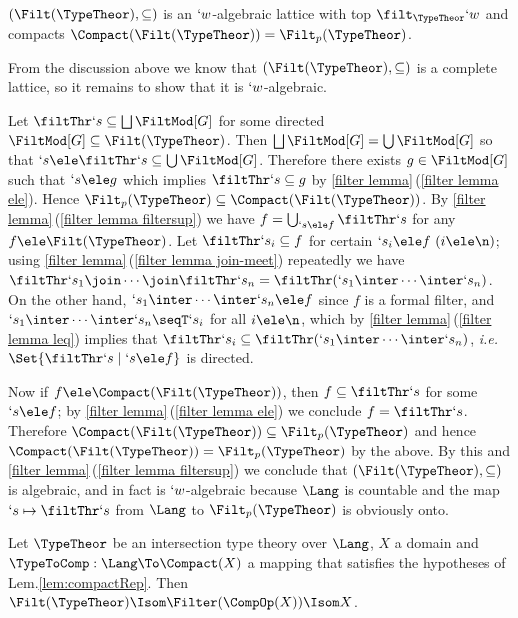 \documentclass{CSML}
\def\ie{\emph{i.e.}}
\begin{document}
 \begin{lem} \label{prop:formal-filt}
$(\Filt(\TypeTheor),\subseteq)$ is an $`w $-algebraic lattice with top $\filt_{\TypeTheor} `w$ and compacts $\Compact(\Filt(\TypeTheor)) = \Filt_p(\TypeTheor)$.
 \end{lem}

 \begin{Proof}
From the discussion above we know that $(\Filt(\TypeTheor),\subseteq)$ is a complete lattice, so it remains to show that it is $`w$-algebraic.

Let $\filtThr `s \subseteq \bigsqcup{\FiltMod[G]}$ for some directed ${\FiltMod[G]} \subseteq \Filt(\TypeTheor)$. 
Then $\bigsqcup{\FiltMod[G]} = \bigcup{\FiltMod[G]}$ so that $`s\ele \filtThr `s \subseteq \bigcup{\FiltMod[G]}$. Therefore there exists $g\in{\FiltMod[G]}$ such that $`s\ele g$ which implies $\filtThr `s \subseteq g$ by \ref{filter lemma}\,(\ref{filter lemma ele}). 
Hence $\Filt_p(\TypeTheor) \subseteq \Compact(\Filt(\TypeTheor))$.
%
By \ref{filter lemma}\,(\ref{filter lemma filtersup}) we have $f = \bigcup_{`s \ele f} \filtThr `s $ for any $f \ele \Filt(\TypeTheor)$. 
Let $\filtThr `s_i \subseteq f$ for certain $`s_i \ele f ~ (i \ele \n)$; using \ref{filter lemma}\,(\ref{filter lemma join-meet}) repeatedly we have $\filtThr `s_1 \join\cdots\join \filtThr`s_n = \filtThr(`s_1\inter\cdots\inter `s_n)$. 
On the other hand, $`s_1\inter\cdots\inter `s_n \ele f$ since $f$ is a formal filter, and $`s_1\inter\cdots\inter `s_n \seqT `s_i$ for all $i \ele \n$, which by \ref{filter lemma}\,(\ref{filter lemma leq}) implies that $ \filtThr `s_i \subseteq \filtThr(`s_1\inter\cdots\inter `s_n)$, \ie~$\Set{\filtThr `s \mid `s\ele f}$ is directed. 

Now if $f\ele \Compact(\Filt(\TypeTheor))$, then $f\subseteq \filtThr `s$ for some $`s \ele f$; by \ref{filter lemma}\,(\ref{filter lemma ele}) we conclude $f = \filtThr `s$. 
Therefore $\Compact(\Filt(\TypeTheor))\subseteq \Filt_p(\TypeTheor)$ and hence $\Compact(\Filt(\TypeTheor)) = \Filt_p(\TypeTheor)$ by the above. 
By this and \ref{filter lemma}\,(\ref{filter lemma filtersup}) we conclude that $(\Filt(\TypeTheor),\subseteq)$ is algebraic, and in fact is $`w$-algebraic because $\Lang$ is countable and the map $`s \mapsto \filtThr `s$ from $\Lang$ to $ \Filt_p(\TypeTheor)$ is obviously onto.
 \end{Proof}


 \begin{prop} \label{prop:filter-iso} 
Let $\TypeTheor$ be an intersection type theory over $\Lang$, $X$ a domain and $ \TypeToComp: \Lang \To \Compact(X)$ a mapping that satisfies the hypotheses of Lem.\skp\ref{lem:compactRep}. 
Then $\Filt(\TypeTheor) \Isom \Filter(\CompOp(X)) \Isom X$.
 \end{prop}
\end{document}
